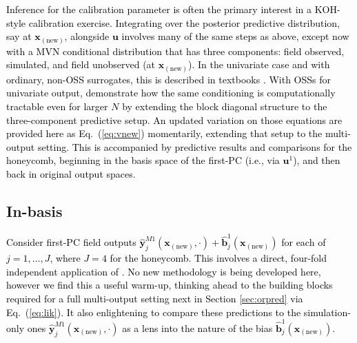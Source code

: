 \documentclass[12pt]{article}
\newcommand{\blu}[1]{\textcolor{black}{#1}} %
\newcommand{\blunew}[1]{\textcolor{black}{#1}} %
\begin{document}
\blu{  
Inference for the calibration parameter is often  the primary interest in a
KOH-style calibration exercise.  %
Integrating over the posterior predictive distribution, say at
$\mathbf{x}_{\mathrm{(new)}}$, alongside $\mathbf{u}$ involves many of the same
steps as above, except now with a MVN conditional distribution that has three
components: field observed, simulated, and field unobserved (at
$\mathbf{x}_{\mathrm{(new)}}$).  In the univariate case and with ordinary,
non-OSS surrogates, this is described in textbooks \citep[e.g.,][\blunew{Chapter
8.1.5}]{gramacy2020surrogates}.  With OSSs for
univariate output, \citet{Huang:2018} demonstrate how the same conditioning is
computationally tractable even for larger \blunew{$N$} by extending the block
diagonal structure to the three-component predictive setup.  An updated
variation on those equations are provided here as
Eq.~(\ref{eq:vnew}) momentarily, extending that setup to the
multi-output setting. This is accompanied by predictive results and
comparisons for the honeycomb, beginning in the basis space of the
first-PC (i.e., via $\mathbf{u}^1$), and then back in original output spaces.
}
 

\subsection{In-basis}
\label{sec:pcpred}

 \blu{
Consider first-PC field outputs
$\hat{\mathbf{y}}^{M1}_j( \mathbf{x}_{\mathrm{(new)}}, \cdot ) +
\hat{\mathbf{b}}^1_j(\mathbf{x}_{\mathrm{(new)}})$ for each of $j=1,\dots, J$, 
where $J=4$ for the honeycomb.
This involves a direct, four-fold independent application of
\citet{Huang:2018}.  No new methodology is being developed here, however we
find this a useful warm-up, thinking ahead to the building blocks required for
a full multi-output setting next in Section \ref{sec:orpred} via
Eq.~(\ref{eq:lik}).  It also enlightening to compare these predictions to the
simulation-only ones $\hat{\mathbf{y}}^{M1}_j( \mathbf{x}_{\mathrm{(new)}},
\cdot)$ as a lens into the nature of the bias
$\hat{\mathbf{b}}^1_j(\mathbf{x}_{\mathrm{(new)}})$. }

 
\end{document}
